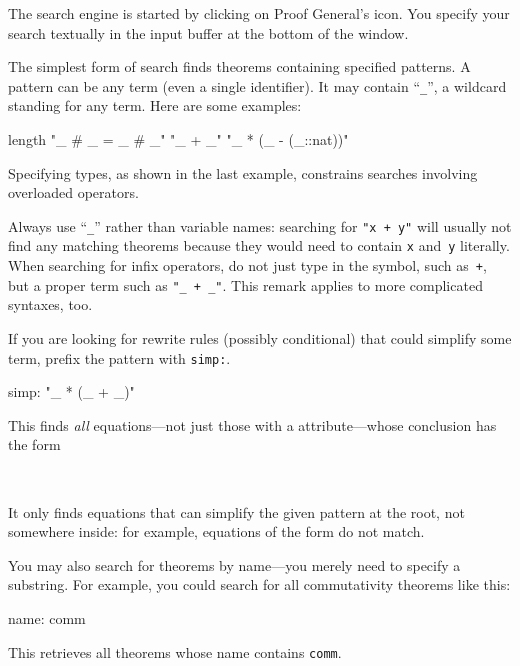 \begin{isabellebody}
\begin{isamarkuptext}
\begin{pgnote}
The search engine is started by clicking on Proof General's  icon.
You specify your search textually in the input buffer at the bottom
of the window.
\end{pgnote}

The simplest form of search finds theorems containing specified
patterns.  A pattern can be any term (even
a single identifier).  It may contain ``\texttt{\_}'', a wildcard standing
for any term. Here are some
examples:
\begin{ttbox}
length
"_ # _ = _ # _"
"_ + _"
"_ * (_ - (_::nat))"
\end{ttbox}
Specifying types, as shown in the last example, 
constrains searches involving overloaded operators.

\begin{warn}
Always use ``\texttt{\_}'' rather than variable names: searching for
\texttt{"x + y"} will usually not find any matching theorems
because they would need to contain \texttt{x} and~\texttt{y} literally.
When searching for infix operators, do not just type in the symbol,
such as~\texttt{+}, but a proper term such as \texttt{"_ + _"}.
This remark applies to more complicated syntaxes, too.
\end{warn}

If you are looking for rewrite rules (possibly conditional) that could
simplify some term, prefix the pattern with \texttt{simp:}.
\begin{ttbox}
simp: "_ * (_ + _)"
\end{ttbox}
This finds \emph{all} equations---not just those with a  attribute---whose conclusion has the form
\begin{isabelle}%
\ \ \ \ \ {}\ {}\ {}{}\ {}\ {}{}\ {}\ {}%
\end{isabelle}
It only finds equations that can simplify the given pattern
at the root, not somewhere inside: for example, equations of the form
 do not match.

You may also search for theorems by name---you merely
need to specify a substring. For example, you could search for all
commutativity theorems like this:
\begin{ttbox}
name: comm
\end{ttbox}
This retrieves all theorems whose name contains \texttt{comm}.


\end{isamarkuptext}
\end{isabellebody}
